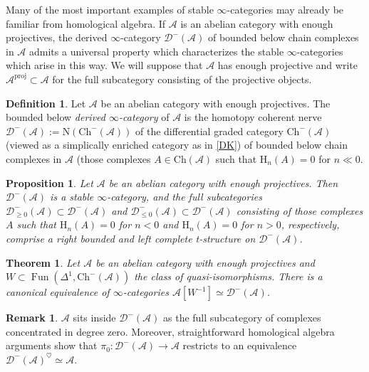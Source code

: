 \documentclass[12pt]{article}
\newtheorem{theorem}{Theorem}[subsection]
\newtheorem{proposition}{Proposition}[subsection]
\theoremstyle{definition}
\newtheorem{definition}{Definition}[subsection]
\newtheorem{remark}{Remark}[subsection]
\newcommand{\A}{\mathcal{A}}
\newcommand{\D}{\mathcal{D}}
\renewcommand{\i}{\infty}
\DeclareMathOperator{\Fun}{Fun}
\DeclareMathOperator{\proj}{proj}
\begin{document}
Many of the most important examples of stable $\infty$-categories may already be familiar from homological algebra.
If ${\mathcal{A}}$ is an abelian category with enough projectives, the derived ${\infty}$-category ${\D^-(\mathcal{A})}$\index{${\D^-(\mathcal{A})}$} of bounded below chain complexes in $\A$ admits a universal property which characterizes the stable $\i$-categories which arise in this way.
We will suppose that $\A$ has enough projective and write $\A^{\proj}\subset\A$ for the full subcategory consisting of the projective objects.


\begin{definition}
Let $\A$ be an abelian category with enough projectives.
The bounded below {\em derived $\infty$-category}\index{$\D(\A)$} of $\A$ is the homotopy coherent  nerve
$
\D^-(\A):=\mathrm{N}(\mathrm{Ch}^-(\A))
$
of the differential graded category $\mathrm{Ch}^-(\A)$ (viewed as a simplically enriched category as in \autoref{DK}) of bounded below chain complexes in $\A$ (those complexes $A\in\mathrm{Ch}(\A)$ such that $\mathrm{H}_n(A)=0$ for $n\ll 0$.
\end{definition} 

\begin{proposition}{\em \cite[Corollary 1.3.2.18 and Proposition 1.3.2.19]{HA}}
Let $\A$ be an abelian category with enough projectives.
Then $\D^-(\A)$ is a stable $\i$-category, and the full subcategories $\D^-_{\geq 0}(\A)\subset\D^-(\A)$ and $\D^-_{\leq 0}(\A)\subset\D^-(\A)$ consisting of those complexes $A$ such that $\mathrm{H}_n(A)=0$ for $n<0$ and $\mathrm{H}_n(A)=0$ for $n>0$, respectively, comprise a right bounded and left complete t-structure on $\D^-(\A)$.
\end{proposition}

\begin{theorem}{\em \cite[Theorem 1.3.4.4]{HA}}
Let $\A$ be an abelian category with enough projectives and $W\subset\Fun(\Delta^1,\mathrm{Ch}^-(\A))$ the class of quasi-isomorphisms.
There is a canonical equivalence of $\i$-categories $\A[W^{-1}]\simeq\D^-(\A)$.
\end{theorem}




\begin{remark} ${\mathcal{A}}$ sits inside ${\D^-(\mathcal{A})}$ as the full subcategory of complexes concentrated in degree zero.
Moreover, straightforward homological algebra arguments show that $\pi_0: \D^-(\mathcal{A}) \rightarrow \mathcal{A}$ restricts to an equivalence $\D^-(\A)^{\heartsuit}\simeq\A$.
\end{remark}
\end{document}
